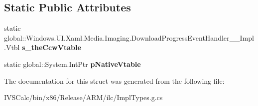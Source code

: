 \subsection*{Static Public Attributes}
\begin{DoxyCompactItemize}
\item 
\mbox{\label{struct_windows_1_1_u_i_1_1_xaml_1_1_media_1_1_imaging_1_1_download_progress_event_handler_____impl_1_1_vtbl_a95a0325d9c661bfa44d59b34c2307a01}} 
static global\+::\+Windows.\+U\+I.\+Xaml.\+Media.\+Imaging.\+Download\+Progress\+Event\+Handler\+\_\+\+\_\+\+Impl.\+Vtbl {\bfseries s\+\_\+the\+Ccw\+Vtable}
\item 
\mbox{\label{struct_windows_1_1_u_i_1_1_xaml_1_1_media_1_1_imaging_1_1_download_progress_event_handler_____impl_1_1_vtbl_a8694faf24b6db25a3b2b3bdc9a55e081}} 
static global\+::\+System.\+Int\+Ptr {\bfseries p\+Native\+Vtable}
\end{DoxyCompactItemize}


The documentation for this struct was generated from the following file\+:\begin{DoxyCompactItemize}
\item 
I\+V\+S\+Calc/bin/x86/\+Release/\+A\+R\+M/ilc/Impl\+Types.\+g.\+cs\end{DoxyCompactItemize}
